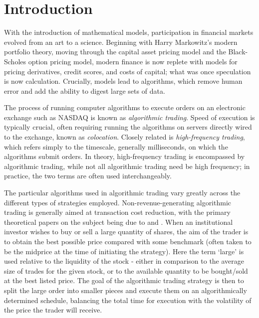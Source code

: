 \chapter{Introduction}

With the introduction of mathematical models, participation in financial markets evolved from an art to a science. Beginning with Harry Markowitz's modern portfolio theory, moving through the capital asset pricing model and the Black-Scholes option pricing model, modern finance is now replete with models for pricing derivatives, credit scores, and costs of capital; what was once speculation is now calculation. Crucially, models lead to algorithms, which remove human error and add the ability to digest large sets of data. 

The process of running computer algorithms to execute orders on an electronic exchange such as NASDAQ is known as \emph{algorithmic trading}. Speed of execution is typically crucial, often requiring running the algorithms on servers directly wired to the exchange, known as \emph{colocation}. Closely related is \emph{high-frequency trading}, which refers simply to the timescale, generally milliseconds, on which the algorithms submit orders. In theory, high-frequency trading is encompassed by algorithmic trading, while not all algorithmic trading need be high frequency; in practice, the two terms are often used interchangeably. 

The particular algorithms used in algorithmic trading vary greatly across the different types of strategies employed. Non-revenue-generating algorithmic trading is generally aimed at transaction cost reduction, with the primary theoretical papers on the subject being due to \citet{Bertsimas98} and \citet{Almgren01}. When an institutional investor wishes to buy or sell a large quantity of shares, the aim of the trader is to obtain the best possible price compared with some benchmark (often taken to be the midprice at the time of initiating the strategy). Here the term `large' is used relative to the liquidity of the stock - either in comparison to the average size of trades for the given stock, or to the available quantity to be bought/sold at the best listed price. The goal of the algorithmic trading strategy is then to split the large order into smaller pieces and execute them on an algorithmically determined schedule, balancing the total time for execution with the volatility of the price the trader will receive. 

